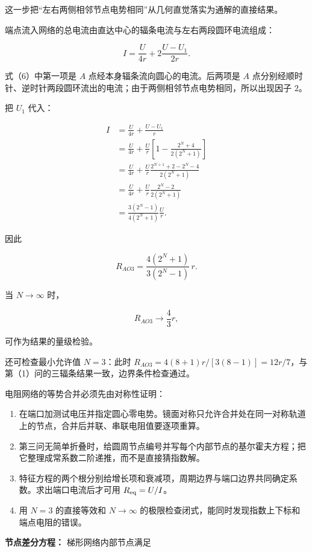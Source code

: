 \documentclass[12pt,a4paper,UTF8]{ctexart}
\newcommand{\tightlist}{\setlength{\itemsep}{0pt}\setlength{\parskip}{0pt}}
\begin{document}
这一步把``左右两侧相邻节点电势相同''从几何直觉落实为通解的直接结果。

端点流入网络的总电流由直达中心的辐条电流与左右两段圆环电流组成：

\[I=\frac{U}{4r}
+2\frac{U-U_1}{2r}. \tag{6}\]

式（6）中第一项是 \(A\) 点经本身辐条流向圆心的电流。后两项是 \(A\)
点分别经顺时针、逆时针两段圆环流出的电流；由于两侧相邻节点电势相同，所以出现因子
\(2\)。

把 \(U_1\) 代入：

\[\begin{aligned}
I
&=\frac{U}{4r}+\frac{U-U_1}{r}\\
&=\frac{U}{4r}
+\frac Ur\left[1-\frac{2^N+4}{2(2^N+1)}\right]\\
&=\frac{U}{4r}
+\frac Ur\frac{2^{N+1}+2-2^N-4}{2(2^N+1)}\\
&=\frac{U}{4r}
+\frac Ur\frac{2^N-2}{2(2^N+1)}\\
&=\frac{3(2^N-1)}{4(2^N+1)}\frac Ur.
\end{aligned}\]

因此

\[\boxed{
R_{AO3}=\frac{4(2^N+1)}{3(2^N-1)}\,r
}.\]

当 \(N\to\infty\) 时，

\[R_{AO3}\longrightarrow \frac43r,\]

可作为结果的量级检验。

还可检查最小允许值 \(N=3\)：此时
\(R_{AO3}=4(8+1)r/[3(8-1)]=12r/7\)，与第（1）问的三辐条结果一致，边界条件检查通过。

电阻网络的等势合并必须先由对称性证明：

\begin{enumerate}
\def\labelenumi{\arabic{enumi}.}
\tightlist
\item
  在端口加测试电压并指定圆心零电势。镜面对称只允许合并处在同一对称轨道上的节点，合并后并联、串联电阻值要逐项重算。
\item
  第三问无简单折叠时，给圆周节点编号并写每个内部节点的基尔霍夫方程；把它整理成常系数二阶递推，而不是直接猜指数解。
\item
  特征方程的两个根分别给增长项和衰减项，周期边界与端口边界共同确定系数。求出端口电流后才可用
  \(R_{\rm eq}=U/I\)。
\item
  用 \(N=3\) 的直接等效和 \(N\to\infty\)
  的极限检查闭式，能同时发现指数上下标和端点电阻的错误。
\end{enumerate}

\textbf{节点差分方程：} 梯形网络内部节点满足
\end{document}
